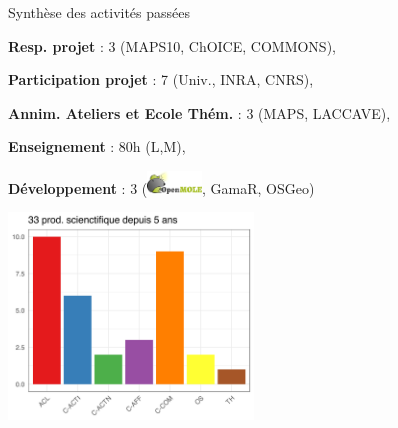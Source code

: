 \documentclass[newPxFont]{beamer}
\begin{document}
\begin{frame}[c]{Synthèse des activités passées}
\vspace{-2em}
\begin{minipage}{0.45\textwidth}\raggedleft
\begin{itemize}
  \small{
  \item \textbf{Resp. projet} : 3 (MAPS10, ChOICE, COMMONS),
  \item \textbf{Participation projet} : 7 (Univ., INRA, CNRS),
  \item \textbf{Annim. Ateliers et Ecole Thém.} : 3 (MAPS, LACCAVE),
  \item \textbf{Enseignement} : 80h (L,M),
  \item \textbf{Développement} : 3 (\includegraphics[height=0.6cm]{img/logo_openmole}, GamaR, OSGeo)}
\end{itemize}
\end{minipage}
\noindent\begin{minipage}{0.5\textwidth}%
\includegraphics[width=6.5cm]{img/publication_pie}
\end{minipage}%

\end{frame}

%
%
%
%
\end{document}
